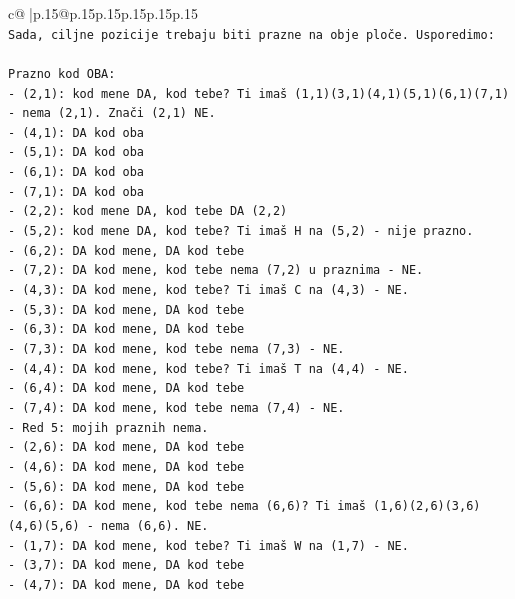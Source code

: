 \documentclass{article}
\begin{document}
{\begin{supertabular}{c@{$\;$}|p{.15\linewidth}@{}p{.15\linewidth}p{.15\linewidth}p{.15\linewidth}p{.15\linewidth}p{.15\linewidth}}
{{{\\ 
\texttt{Sada, ciljne pozicije trebaju biti prazne na obje ploče. Usporedimo:} \\
\\ 
\texttt{Prazno kod OBA:} \\
\texttt{{-} (2,1): kod mene DA, kod tebe? Ti imaš (1,1)(3,1)(4,1)(5,1)(6,1)(7,1) {-} nema (2,1). Znači (2,1) NE.} \\
\texttt{{-} (4,1): DA kod oba} \\
\texttt{{-} (5,1): DA kod oba} \\
\texttt{{-} (6,1): DA kod oba} \\
\texttt{{-} (7,1): DA kod oba} \\
\texttt{{-} (2,2): kod mene DA, kod tebe DA (2,2)} \\
\texttt{{-} (5,2): kod mene DA, kod tebe? Ti imaš H na (5,2) {-} nije prazno.} \\
\texttt{{-} (6,2): DA kod mene, DA kod tebe} \\
\texttt{{-} (7,2): DA kod mene, kod tebe nema (7,2) u praznima {-} NE.} \\
\texttt{{-} (4,3): DA kod mene, kod tebe? Ti imaš C na (4,3) {-} NE.} \\
\texttt{{-} (5,3): DA kod mene, DA kod tebe} \\
\texttt{{-} (6,3): DA kod mene, DA kod tebe} \\
\texttt{{-} (7,3): DA kod mene, kod tebe nema (7,3) {-} NE.} \\
\texttt{{-} (4,4): DA kod mene, kod tebe? Ti imaš T na (4,4) {-} NE.} \\
\texttt{{-} (6,4): DA kod mene, DA kod tebe} \\
\texttt{{-} (7,4): DA kod mene, kod tebe nema (7,4) {-} NE.} \\
\texttt{{-} Red 5: mojih praznih nema.} \\
\texttt{{-} (2,6): DA kod mene, DA kod tebe} \\
\texttt{{-} (4,6): DA kod mene, DA kod tebe} \\
\texttt{{-} (5,6): DA kod mene, DA kod tebe} \\
\texttt{{-} (6,6): DA kod mene, kod tebe nema (6,6)? Ti imaš (1,6)(2,6)(3,6)(4,6)(5,6) {-} nema (6,6). NE.} \\
\texttt{{-} (1,7): DA kod mene, kod tebe? Ti imaš W na (1,7) {-} NE.} \\
\texttt{{-} (3,7): DA kod mene, DA kod tebe} \\
\texttt{{-} (4,7): DA kod mene, DA kod tebe} \\
}}}
\end{supertabular}}
\end{document}
